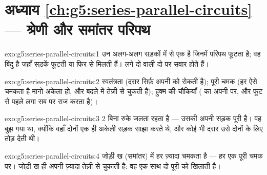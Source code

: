 \section*{अध्याय \ref{ch:g5:series-parallel-circuits} --- श्रेणी और समांतर परिपथ}

\begin{solution}{exo:g5:series-parallel-circuits:1}
 उन अलग-अलग सड़कों में से एक है जिनमें परिपथ फूटता है;  वह
बिंदु है जहाँ सड़कें फूटती या फिर से मिलती हैं।  लगे दो
  वाली दो  पर सवार होते हैं।
\end{solution}

\begin{solution}{exo:g5:series-parallel-circuits:2}
स्वतंत्रता (दरार सिर्फ़ अपनी  को रोकती है); पूरी चमक (हर 
ऐसे चमकता है मानो अकेला हो, और बदले में  तेज़ी से चुकती है);
हुक्म की चौकियाँ ( का  अपनी  पर, और फूट से पहले लगा
 सब पर राज करता है)।
\end{solution}

\begin{solution}{exo:g5:series-parallel-circuits:3}
 2 बिना रुके जलता रहता है --- उसकी अपनी सड़क पूरी है। 
वह बुझ गया था, क्योंकि वहाँ दोनों  एक ही अकेली सड़क साझा करते थे,
और कोई भी दरार उसे दोनों के लिए तोड़ देती थी।
\end{solution}

\begin{solution}{exo:g5:series-parallel-circuits:4}
जोड़ी ख (समांतर) में हर  ज़्यादा चमकता है --- हर एक पूरी चमक पर।
जोड़ी ख ही अपनी  ज़्यादा तेज़ी से चुकाती है: वह एक साथ दो पूरी
 को खिलाती है।
\end{solution}

